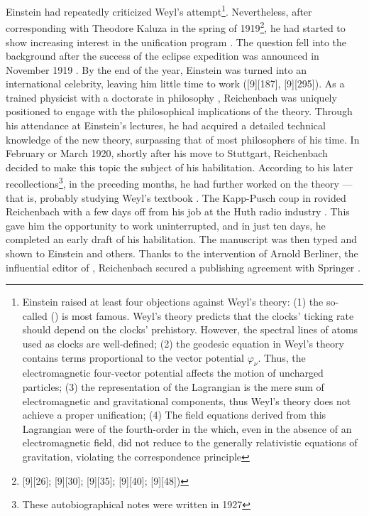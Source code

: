 \documentclass[final]{article}
\newcommand{\phin}{\ensuremath{\varphi_\nu}\xspace}
\newcommand{\WT}{Weyl's theory\xspace}
\begin{document}
Einstein had repeatedly criticized Weyl's attempt\footnote{Einstein raised at least four objections against Weyl's theory: (1) the so-called  () \citep{Einstein1918b} is most famous. \WT predicts that the clocks' ticking rate should depend on the clocks' prehistory. However, the spectral lines of atoms used as clocks are well-defined; (2) the geodesic equation in Weyl's theory con­tains terms proportional to the vector potential \phin. Thus, the electromagnetic four-vector potential affects the motion of uncharged particles; (3) the representation of the Lagrangian is the mere sum of electromagnetic and gravitational components, thus \WT does not achieve a proper unification; (4) The field equations derived from this Lagrangian were of the fourth-order in the \gmn which, even in the absence of an electromagnetic field, did not reduce to the generally relativistic equations of gravitation, violating the correspondence principle}. Nevertheless, after corresponding with Theodore Kaluza in the spring of 1919\citep{Wuensch2005}\footnote{[9][26]; [9][30]; [9][35]; [9][40]; [9][48])}, he had started to show increasing interest in the unification program \citep{Einstein1919a}. The question fell into the background after the success of the eclipse expedition was announced in November 1919 \citep{Dyson1920}. By the end of the year, Einstein was turned into an international celebrity, leaving him little time to work ([9][187], [9][295]). As a trained physicist with a doctorate in philosophy \citep{Reichenbach1916}, Reichenbach was uniquely positioned to engage with the philosophical implications of the theory. Through his attendance at Einstein's lectures, he had acquired a detailed technical knowledge of the new theory, surpassing that of most philosophers of his time. In February or March 1920, shortly after his move to Stuttgart, Reichenbach decided to make this topic the subject of his habilitation. According to his later recollections\footnote{These autobiographical notes \cite[044-06-23]{HR} were written in 1927}, in the preceding months, he had further worked on the theory  \citep[044-06-23]{HR}---that is, probably studying Weyl's textbook  \citep{Weyl1918}. The Kapp-Pusch coup in  rovided Reichenbach with a few days off from his job at the Huth radio industry  \citep[044-06-23]{HR}. This gave him the opportunity to work uninterrupted, and in just ten days, he completed an early draft of his habilitation. The manuscript was then typed and shown to Einstein and others. Thanks to the intervention of Arnold Berliner, the influential editor of , Reichenbach secured a publishing agreement with Springer \citep[044-06-23]{HR}.
\end{document}

